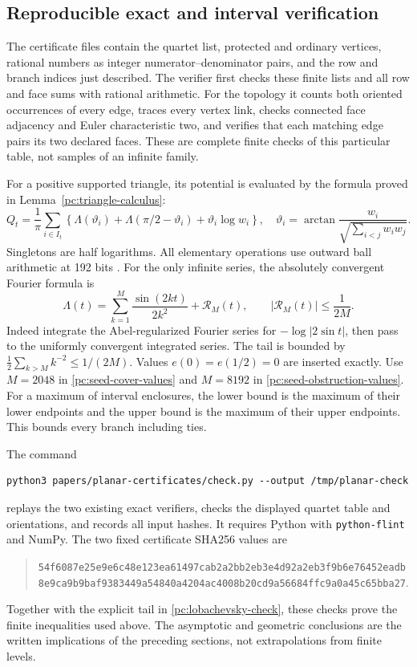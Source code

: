 \documentclass[11pt]{article}
\numberwithin{equation}{section}
\theoremstyle{definition}\newtheorem{definition}[theorem]{Definition}
\theoremstyle{remark}\newtheorem{remark}[theorem]{Remark}
\begin{document}
\subsection{Reproducible exact and interval verification}\label{pc:reproduce}
The certificate files contain the quartet list, protected and ordinary
vertices, rational numbers as integer numerator--denominator pairs,
and the row and branch indices just described. The verifier first
checks these finite lists and all row and face sums with rational
arithmetic. For the topology it counts both oriented occurrences
of every edge, traces every vertex link, checks connected face
adjacency and Euler characteristic two, and verifies that each
matching edge pairs its two declared faces. These are complete
finite checks of this particular table, not samples of an
infinite family.

For a positive supported triangle, its potential is evaluated by
the formula proved in Lemma~\ref{pc:triangle-calculus}:
\[
 Q_t=\frac1\pi\sum_{i\in I_t}
 \left\{\Lambda(\vartheta_i)+
        \Lambda(\pi/2-\vartheta_i)+\vartheta_i\log w_i\right\},
 \quad
 \vartheta_i=\arctan\frac{w_i}{\sqrt{\sum_{i<j}w_iw_j}}.
\]
Singletons are half logarithms. All elementary operations use
outward ball arithmetic at 192 bits \cite{Arb}. For the only
infinite series, the absolutely convergent Fourier formula is
\begin{equation}\label{pc:lobachevsky-check}
 \Lambda(t)=\sum_{k=1}^{M}\frac{\sin(2kt)}{2k^2}+\mathcal R_M(t),
                       \qquad |\mathcal R_M(t)|\le\frac1{2M}.
\end{equation}
Indeed integrate the Abel-regularized Fourier series for
\(-\log|2\sin t|\), then pass to the uniformly convergent
integrated series. The tail is bounded by
\(\frac12\sum_{k>M}k^{-2}\le1/(2M)\).
Values \(e(0)=e(1/2)=0\) are inserted exactly.
Use \(M=2048\) in \eqref{pc:seed-cover-values} and \(M=8192\)
in \eqref{pc:seed-obstruction-values}. For a maximum of interval
enclosures, the lower bound is the maximum of their lower
endpoints and the upper bound is the maximum of their upper
endpoints. This bounds every branch including ties.

The command
\begin{verbatim}
python3 papers/planar-certificates/check.py --output /tmp/planar-check
\end{verbatim}
replays the two existing exact verifiers, checks the displayed
quartet table and orientations, and records all input hashes.
It requires Python with \texttt{python-flint} and NumPy. The two fixed
certificate SHA256 values are
\begin{quote}\small
\nolinkurl{54f6087e25e9e6c48e123ea61497cab2a2bb2eb3e4d92a2eb3f9b6e76452eadb}\\
\nolinkurl{8e9ca9b9baf9383449a54840a4204ac4008b20cd9a56684ffc9a0a45c65bba27}.
\end{quote}
Together with the explicit tail in \eqref{pc:lobachevsky-check},
these checks prove the finite inequalities used above. The
asymptotic and geometric conclusions are the written implications
of the preceding sections, not extrapolations from finite levels.
\end{document}
